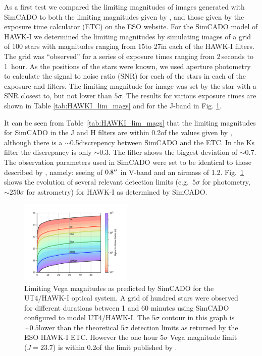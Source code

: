 As a first test we compared the limiting magnitudes of images generated with SimCADO to both the limiting magnitudes given by \citet{hawki}, and those given by the exposure time calculator (ETC) on the ESO website.
For the SimCADO model of HAWK-I we determined the limiting magnitudes by simulating images of a grid of 100 stars with magnitudes ranging from 15\m to 27\m in each of the HAWK-I filters.
The grid was ``observed'' for a series of exposure times ranging from 2\,seconds to 1~hour.
As the positions of the stars were known, we used aperture photometry to calculate the signal to noise ratio (SNR) for each of the stars in each of the exposure and filters.
The limiting magnitude for image was set by the star with a SNR closest to, but not lower than $5\sigma$.
The results for various exposure times are shown in Table \ref{tab:HAWKI_lim_mags} and for the J-band in Fig. \ref{fig:HAWKI_rainbow_j}.

It can be seen from Table~\ref{tab:HAWKI_lim_mags} that the limiting magnitudes for SimCADO in the J and H filters are within 0.2\m of the values given by \citet{hawki}, although there is a $\sim$0.5\m discrepency between SimCADO and the ETC.
In the Ks filter the discrepancy is only $\sim$0.3\m.
The \brgamma filter shows the biggest deviation of $\sim$0.7\m.
The observation parameters used in SimCADO were set to be identical to those described by \citet{hawki}, namely: seeing of $0.8^{\prime\prime}$ in V-band and an airmass of 1.2. Fig.~\ref{fig:HAWKI_rainbow_j} shows the evolution of several relevant detection limits (e.g.\ $5\sigma$ for photometry, $\sim 250\sigma$ for astrometry) for HAWK-I as determined by SimCADO.


\begin{figure}

    \centering
    \includegraphics[width=0.48\textwidth]{images/HAWKI_rainbow_J}
    
    \caption{Limiting Vega magnitudes as predicted by SimCADO for the UT4/HAWK-I optical system.
    A grid of hundred stars were observed for different durations between 1 and 60 minutes using SimCADO configured to model UT4/HAWK-I.
    The $5\sigma$ contour in this graph is $\sim 0.5$\m lower than the theoretical $5\sigma$ detection limits as returned by the ESO HAWK-I ETC.
    However the one hour $5\sigma$ Vega magnitude limit ($J=23.7$\m) is within 0.2\m  of the limit published by \citet{hawki}.}
    \label{fig:HAWKI_rainbow_j}

\end{figure}


